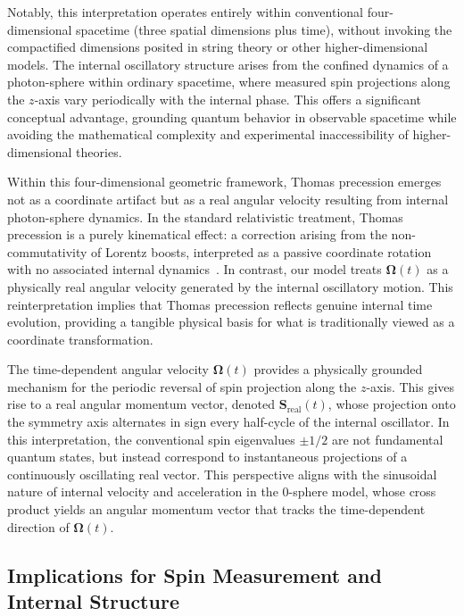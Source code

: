 \documentclass[%
 reprint,
 amsmath,amssymb,
 aps,
]{revtex4-1}
\numberwithin{equation}{section}%
\begin{document}
Notably, this interpretation operates entirely within conventional four-dimensional spacetime (three spatial dimensions plus time), without invoking the compactified dimensions posited in string theory or other higher-dimensional models. The internal oscillatory structure arises from the confined dynamics of a photon-sphere within ordinary spacetime, where measured spin projections along the $z$-axis vary periodically with the internal phase. This offers a significant conceptual advantage, grounding quantum behavior in observable spacetime while avoiding the mathematical complexity and experimental inaccessibility of higher-dimensional theories.

Within this four-dimensional geometric framework, Thomas precession emerges not as a coordinate artifact but as a real angular velocity resulting from internal photon-sphere dynamics. In the standard relativistic treatment, Thomas precession is a purely kinematical effect: a correction arising from the non-commutativity of Lorentz boosts, interpreted as a passive coordinate rotation with no associated internal dynamics~\cite{Jackson1999}. In contrast, our model treats $\boldsymbol{\Omega}(t)$ as a physically real angular velocity generated by the internal oscillatory motion. This reinterpretation implies that Thomas precession reflects genuine internal time evolution, providing a tangible physical basis for what is traditionally viewed as a coordinate transformation.

The time-dependent angular velocity $\boldsymbol{\Omega}(t)$ provides a physically grounded mechanism for the periodic reversal of spin projection along the $z$-axis. This gives rise to a real angular momentum vector, denoted $\mathbf{S}_{\mathrm{real}}(t)$, whose projection onto the symmetry axis alternates in sign every half-cycle of the internal oscillator. In this interpretation, the conventional spin eigenvalues $\pm 1/2$ are not fundamental quantum states, but instead correspond to instantaneous projections of a continuously oscillating real vector. This perspective aligns with the sinusoidal nature of internal velocity and acceleration in the 0-sphere model, whose cross product yields an angular momentum vector that tracks the time-dependent direction of $\boldsymbol{\Omega}(t)$.


\subsection{Implications for Spin Measurement and Internal Structure}
\end{document}
